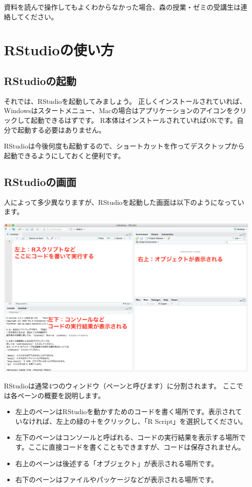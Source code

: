 \documentclass[]{book}
\providecommand{\tightlist}{%
  \setlength{\itemsep}{0pt}\setlength{\parskip}{0pt}}
\begin{document}
資料を読んで操作してもよくわからなかった場合、森の授業・ゼミの受講生は連絡してください。

\chapter{RStudioの使い方}\label{RStudio}

\section{RStudioの起動}\label{rstudioux306eux8d77ux52d5}

それでは、RStudioを起動してみましょう。
正しくインストールされていれば、Windowsはスタートメニュー、Macの場合はアプリケーションのアイコンをクリックして起動できるはずです。
R本体はインストールされていればOKです。自分で起動する必要はありません。

RStudioは今後何度も起動するので、ショートカットを作ってデスクトップから起動できるようにしておくと便利です。

\section{RStudioの画面}\label{rstudioux306eux753bux9762}

人によって多少異なりますが、RStudioを起動した画面は以下のようになっています。

\begin{center}\includegraphics[width=0.7\linewidth]{image/RStudio_screen} \end{center}

RStudioは通常4つのウィンドウ（ペーンと呼びます）に分割されます。
ここでは各ペーンの概要を説明します。

\begin{itemize}
\tightlist
\item
  左上のペーンはRStudioを動かすためのコードを書く場所です。表示されていなければ、左上の緑の＋をクリックし、「R
  Script」を選択してください。
\item
  左下のペーンはコンソールと呼ばれる、コードの実行結果を表示する場所です。ここに直接コードを書くこともできますが、コードは保存されません。
\item
  右上のペーンは後述する「オブジェクト」が表示される場所です。
\item
  右下のペーンはファイルやパッケージなどが表示される場所です。
\end{itemize}
\end{document}
